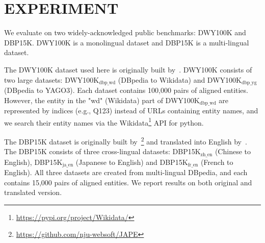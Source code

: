 \section{EXPERIMENT} \label{sec:exp}

We evaluate \solution on two widely-acknowledged public benchmarks: DWY100K and DBP15K. DWY100K is a monolingual dataset and DBP15K is a multi-lingual dataset.   


 The DWY100K dataset used here is originally built by~\cite{sun2018bootstrapping}. DWY100K consists of two large datasets: DWY100K$_{\text{dbp\_wd}}$ (DBpedia to Wikidata) and DWY100K$_{\text{dbp\_yg}}$ (DBpedia to YAGO3). Each dataset contains 100,000 pairs of aligned entities. However, the entity in the "wd" (Wikidata) part of DWY100K$_{\text{dbp\_wd}}$ are represented by indices (e.g., Q123) instead of URLs containing entity names, and we search their entity names via the Wikidata\footnote{\url{https://pypi.org/project/Wikidata/}} API for python.



 The DBP15K dataset is originally built by~\cite{JAPE}\footnote{\url{https://github.com/nju-websoft/JAPE}} and translated into English by~\cite{xu2019cross-lingual}. The DBP15K consists of three cross-lingual datasets: DBP15K$_{\text{zh\_en}}$ (Chinese to English), DBP15K$_{\text{ja\_en}}$ (Japanese to English) and DBP15K$_{\text{fr\_en}}$ (French to English). All three datasets are created from multi-lingual DBpedia, and each contains 15,000 pairs of aligned entities. 
We report results on both original and translated version.

